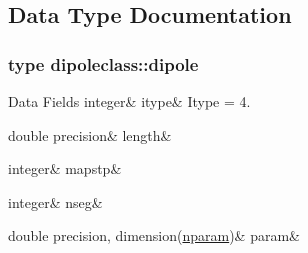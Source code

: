 \subsection{Data Type Documentation}
\label{structdipoleclass_1_1dipole}
\subsubsection{type dipoleclass\+::dipole}
\begin{DoxyFields}{Data Fields}
\mbox{\label{namespacedipoleclass_a488890695ad6becc93db5079e740868e}} 
integer&
itype&
Itype = 4. \\
\hline

\mbox{\label{namespacedipoleclass_aada668e2b218b56769c64c2ec9f21dea}} 
double precision&
length&
\\
\hline

\mbox{\label{namespacedipoleclass_af0a1da636573d6878f6d1c11d0c9e5ab}} 
integer&
mapstp&
\\
\hline

\mbox{\label{namespacedipoleclass_a5f280e96dab020ba48b5b28f47b0d5fa}} 
integer&
nseg&
\\
\hline

\mbox{\label{namespacedipoleclass_a5ce0b668334f66ce50e3852ce17ddc39}} 
double precision, dimension(\mbox{\hyperlink{namespacedipoleclass_abc619199e1e9a2811da9e97630125da3}{nparam}})&
param&
\\
\hline

\end{DoxyFields}
